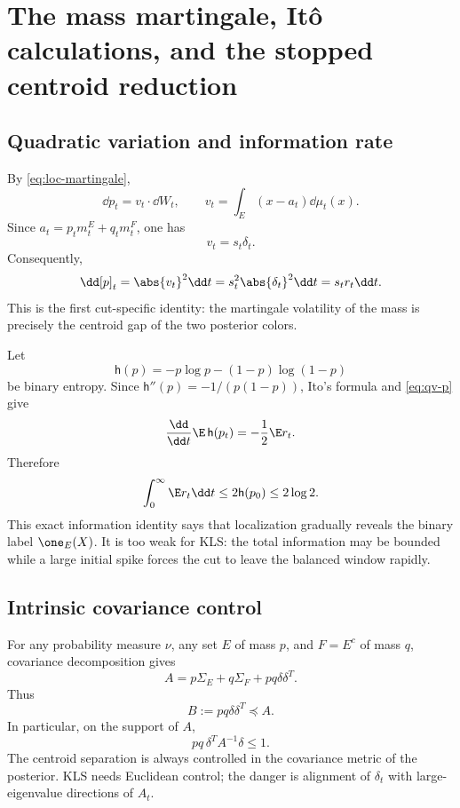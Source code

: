 \documentclass[../../main.tex]{subfiles}
\begin{document}
\section{The mass martingale, It\^o calculations, and the stopped centroid reduction}
\label{sec:mass-martingale}

\subsection{Quadratic variation and information rate}

By \eqref{eq:loc-martingale},
\[
  \dd p_t=v_t\cdot\dd W_t,
  \qquad
  v_t=\int_E(x-a_t)\dd\mu_t(x).
\]
Since $a_t=p_tm_t^E+q_tm_t^F$, one has
\begin{equation}\label{eq:v-s-delta}
  v_t=s_t\delta_t .
\end{equation}
Consequently,
\begin{equation}\label{eq:qv-p}
  \dd[p]_t=\abs{v_t}^2\dd t=s_t^2\abs{\delta_t}^2\dd t=s_tr_t\dd t.
\end{equation}
This is the first cut-specific identity: the martingale volatility of the mass is precisely the
centroid gap of the two posterior colors.

Let
\[
  \mathsf h(p)=-p\log p-(1-p)\log(1-p)
\]
be binary entropy. Since $\mathsf h''(p)=-1/(p(1-p))$, Ito's formula and \eqref{eq:qv-p} give
\begin{equation}\label{eq:entropy-rate}
  \frac{\dd}{\dd t}\E\,\mathsf h(p_t)=-\frac12\E r_t .
\end{equation}
Therefore
\begin{equation}\label{eq:total-info}
  \int_0^\infty \E r_t\dd t\le2\mathsf h(p_0)\le2\log2 .
\end{equation}
This exact information identity says that localization gradually reveals the binary label
$\one_E(X)$. It is too weak for KLS: the total information may be bounded while a large initial
spike forces the cut to leave the balanced window rapidly.

\subsection{Intrinsic covariance control}

For any probability measure $\nu$, any set $E$ of mass $p$, and $F=E^c$ of mass $q$, covariance
decomposition gives
\begin{equation}\label{eq:cov-decomp}
  A=p\Sigma_E+q\Sigma_F+pq\delta\delta^T.
\end{equation}
Thus
\begin{equation}\label{eq:B-le-A}
  B:=pq\delta\delta^T\preceq A.
\end{equation}
In particular, on the support of $A$,
\begin{equation}\label{eq:intrinsic-bound}
  pq\,\delta^TA^{-1}\delta\le1.
\end{equation}
The centroid separation is always controlled in the covariance metric of the posterior. KLS needs
Euclidean control; the danger is alignment of $\delta_t$ with large-eigenvalue directions of $A_t$.
\end{document}
